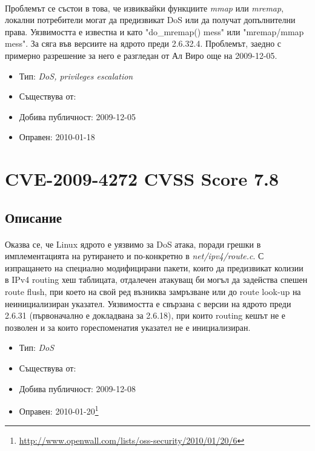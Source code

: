 \documentclass[a4paper,12pt,leqno]{article}
\begin{document}
\paragraph{}
Проблемът се състои в това, че извиквайки функциите \textit{mmap} или \textit{mremap}, 
локални потребители могат да предизвикат DoS или да получат 
допълнителни права. Уязвимостта е известна и като "do\_mremap() mess" или 
"mremap/mmap mess". За сяга във версиите на ядрото преди 2.6.32.4. 
Проблемът, заедно с примерно разрешение за него е разгледан от Ал Виро 
още на 2009-12-05.

\begin{itemize}
    \item Тип: \textit{DoS, privileges escalation}
    \item Съществува от:
  	\item Добива публичност: 2009-12-05
    \item Оправен: 2010-01-18
\end{itemize}


\section{CVE-2009-4272 CVSS Score 7.8}
\subsection{Описание}
\paragraph{}
Оказва се, че Linux ядрото е уязвимо за DoS атака, поради грешки в 
имплементацията на рутирането и по-конкретно в \textit{net/ipv4/route.c}. С 
изпращането на специално модифицирани пакети, които да предизвикат колизии в IPv4 routing хеш таблицата, отдалечен атакуващ би могъл да 
задейства спешен route flush, при което на свой ред възниква замръзване или 
до route look-up на неинициализиран указател. Уязвимостта е свързана с 
версии на ядрото преди 2.6.31 (първоначално е докладвана за 2.6.18), при 
които routing кешът не е позволен и за които гореспоменатия указател не е 
инициализиран.

\begin{itemize}
    \item Тип: \textit{DoS}
    \item Съществува от:
  	\item Добива публичност: 2009-12-08
    \item Оправен: 2010-01-20\footnote{\url{http://www.openwall.com/lists/oss-security/2010/01/20/6}}
\end{itemize}
\end{document}
